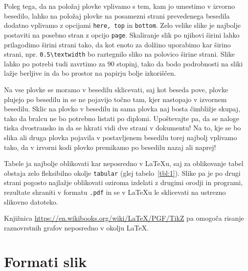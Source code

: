 \documentclass[a4paper, 12pt]{book}
\begin{document}
Poleg tega, da na položaj plovke vplivamo s tem, kam jo umestimo v izvorno besedilo, lahko na položaj plovke na posamezni strani prevedenega besedila dodatno vplivamo z opcijami \texttt{here, top} in \texttt{bottom}.
Zelo velike slike je najbolje postaviti na posebno stran z opcijo \texttt{page}.
Skaliranje slik po njihovi širini lahko prilagodimo širini strani tako, da kot enoto za dolžino uporabimo kar širino strani, npr. \verb=0.5\textwidth= bo raztegnilo sliko na polovico širine strani.
Slike lahko po potrebi tudi zavrtimo za 90 stopinj, tako da bodo podrobnosti na sliki lažje berljive in da bo prostor na papirju bolje izkoriščen.

Na vse plovke se moramo v besedilu sklicevati, saj kot beseda pove, plovke plujejo po besedilu in se ne pojavijo točno tam, kjer nastopajo v izvornem besedilu.
Sklic na plovko v besedilu in sama plovka naj bosta čimbližje skupaj, tako da bralcu ne bo potrebno listati po diplomi. 
Upoštevajte pa, da se naloge tiska dvostransko in da se hkrati vidi dve strani v dokumentu!
Na to, kje se bo slika ali druga plovka pojavila v postavljenem besedilu torej najbolj vplivamo tako, da v izvorni kodi plovko premikamo po besedilu nazaj ali naprej!

Tabele ja najbolje oblikovati kar neposredno v \LaTeX u, saj za oblikovanje tabel obstaja zelo fleksibilno okolje \texttt{tabular} (glej tabelo~\ref{tbl:1}).
Slike pa je po drugi strani  pogosto najla\v zje oblikovati oziroma izdelati z drugimi orodji in programi, rezultate shraniti v formatu {\tt .pdf}  in se v \LaTeX u le sklicevati na ustrezno slikovno datoteko.

Knjižnica \url{https://en.wikibooks.org/wiki/LaTeX/PGF/TikZ} 
pa omo\-go\-ča risanje raznovrstnih grafov neposredno v okolju \LaTeX .


\section{Formati slik}
\end{document}
